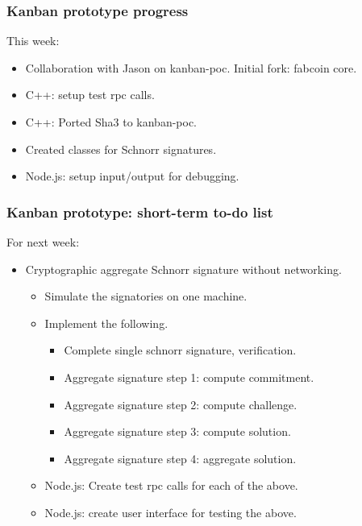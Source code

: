 \begin{frame}
\frametitle{Kanban prototype progress}
This week:
\begin{itemize}
	\item Collaboration with Jason on kanban-poc. Initial fork: fabcoin core.
	\item C++: setup test rpc calls.
	\item C++: Ported Sha3 to kanban-poc.
	\item Created classes for Schnorr signatures. 
	\item Node.js: setup input/output for debugging.
\end{itemize}
\end{frame}

\begin{frame}
\frametitle{Kanban prototype: short-term to-do list}
For next week:
\begin{itemize}
	\item Cryptographic aggregate Schnorr signature without networking.
	\begin{itemize}
		\item Simulate the signatories on one machine.
		\item Implement the following.
		\begin{itemize}
		\item Complete single schnorr signature, verification.
		\item Aggregate signature step 1: compute commitment.
		\item Aggregate signature step 2: compute challenge.
		\item Aggregate signature step 3: compute solution.
		\item Aggregate signature step 4: aggregate solution.
		\end{itemize}
		\item Node.js: Create test rpc calls for each of the above.
		\item Node.js: create user interface for testing the above.
	\end{itemize}
\end{itemize}

\end{frame}